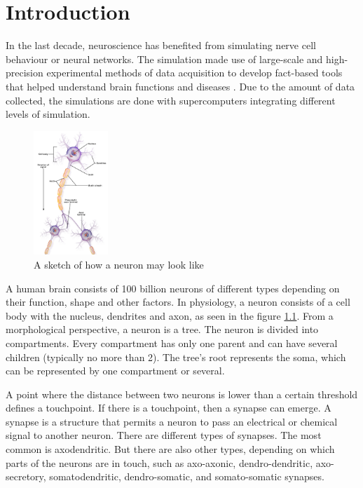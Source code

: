 \chapter{Introduction}

In the last decade, neuroscience has benefited from simulating nerve cell behaviour or neural networks. The simulation made use of large-scale and high-precision experimental methods of data acquisition to develop fact-based tools that helped understand brain functions and diseases \cite{MARKRAM201139}. Due to the amount of data collected, the simulations are done with supercomputers integrating different levels of simulation.
\begin{figure}
    \centering
    \includegraphics[width=0.25\textwidth]{setup/img/NeuronParts.png}
    \caption{A sketch of how a neuron may look like \cite{wiki:interneurons}}
    \label{fig:NeuronParts}
\end{figure}

A human brain consists of 100 billion neurons \cite{HERCULANO2012} of different types depending on their function, shape and other factors. In physiology, a neuron consists of a cell body with the nucleus, dendrites and axon, as seen in the figure \ref{fig:NeuronParts}. From a morphological perspective, a neuron is a tree. The neuron is divided into compartments. Every compartment has only one parent and can have several children (typically no more than 2). The tree's root represents the soma, which can be represented by one compartment or several. 

A point where the distance between two neurons is lower than a certain threshold defines a touchpoint. If there is a touchpoint, then a synapse can emerge. A synapse is a structure that permits a neuron to pass an electrical or chemical signal to another neuron. There are different types of synapses. The most common is axodendritic. But there are also other types, depending on which parts of the neurons are in touch, such as axo-axonic, dendro-dendritic, axo-secretory, somatodendritic, dendro-somatic, and somato-somatic synapses.


